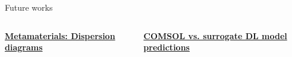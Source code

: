 \documentclass[10pt,aspectratio=169,dvipsnames]{beamer} %
\begin{document}
	\begin{frame}{Future works}
		\begin{columns}[T]
			\begin{column}[t]{0.49\textwidth}
				\centering
				\textbf{\underline{Metamaterials: Dispersion diagrams}}
				\begin{figure}
					\centering
				\end{figure}
			\end{column}
			\begin{column}[t]{0.49\textwidth}
				\centering
				\textbf{\underline{COMSOL vs. surrogate DL model predictions}}
				\begin{figure}
					\centering
				\end{figure}			
			\end{column}		
		\end{columns}				
	\end{frame}		
\end{document}

